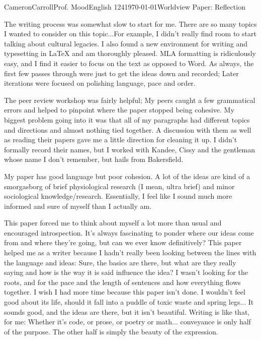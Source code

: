\documentclass[12pt,letterpaper]{article}
\begin{document}
\begin{mla}{Cameron}{Carroll}{Prof. Mood}{English 124}{\today}{Worldview Paper: Reflection}

The writing process was somewhat slow to start for me. There are so many topics I wanted to consider on this topic...For example,  I didn't really find room to start talking about cultural legacies. I also found a new environment for writing and typesetting in LaTeX and am thoroughly pleased. MLA formatting is ridiculously easy, and I find it easier to focus on the text as opposed to Word. As always, the first few passes through were just to get the ideas down and recorded; Later iterations were focused on polishing language, pace and order. 

The peer review workshop was fairly helpful; My peers caught a few grammatical errors and helped to pinpoint where the paper stopped being cohesive. My biggest problem going into it was that all of my paragraphs had different topics and directions and almost nothing tied together. A discussion with them as well as reading their papers gave me a little direction for cleaning it up. I didn't formally record their names, but I worked with Kandee, Cissy and the gentleman whose name I don't remember, but hails from Bakersfield.

My paper has good language but poor cohesion. A lot of the ideas are kind of a smorgasborg of brief physiological research (I mean, ultra brief) and minor sociological knowledge/research. Essentially, I feel like I sound much more informed and sure of myself than I actually am.

This paper forced me to think about myself a lot more than usual and encouraged introspection. It's always fascinating to ponder where our ideas come from and where they're going, but can we ever know definitively? This paper helped me as a writer because I hadn't really been looking between the lines with the language and ideas: Sure, the basics are there, but what are they really saying and how is the way it is said influence the idea? I wasn't looking for the roots, and for the pace and the length of sentences and how everything flows together. I wish I had more time because this paper isn't done. I wouldn't feel good about its life, should it fall into a puddle of toxic waste and spring legs... It sounds good, and the ideas are there, but it isn't beautiful. Writing is like that, for me: Whether it's code, or prose, or poetry or math... conveyance is only half of the purpose. The other half is simply the beauty of the expression.


\end{mla}
\end{document}
